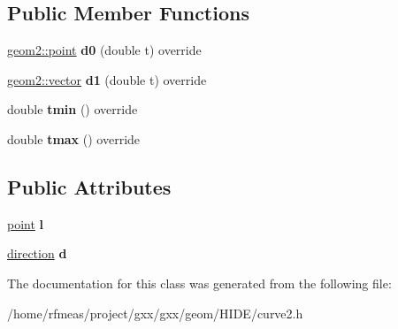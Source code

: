 \subsection*{Public Member Functions}
\begin{DoxyCompactItemize}
\item 
\hyperlink{classmalgo_1_1vector2}{geom2\+::point} {\bfseries d0} (double t) override\hypertarget{classgxx_1_1curve2_1_1line_ad0eb33818eed7291d30b1c2c5fff5899}{}\label{classgxx_1_1curve2_1_1line_ad0eb33818eed7291d30b1c2c5fff5899}

\item 
\hyperlink{classmalgo_1_1vector2}{geom2\+::vector} {\bfseries d1} (double t) override\hypertarget{classgxx_1_1curve2_1_1line_a510227cdeed575ea100866926f447ae7}{}\label{classgxx_1_1curve2_1_1line_a510227cdeed575ea100866926f447ae7}

\item 
double {\bfseries tmin} () override\hypertarget{classgxx_1_1curve2_1_1line_ab8c6acdc4d1d0dcc17613cb3e727a881}{}\label{classgxx_1_1curve2_1_1line_ab8c6acdc4d1d0dcc17613cb3e727a881}

\item 
double {\bfseries tmax} () override\hypertarget{classgxx_1_1curve2_1_1line_a54a7c880465ddca9da79d442a0e51584}{}\label{classgxx_1_1curve2_1_1line_a54a7c880465ddca9da79d442a0e51584}

\end{DoxyCompactItemize}
\subsection*{Public Attributes}
\begin{DoxyCompactItemize}
\item 
\hyperlink{classmalgo_1_1vector2}{point} {\bfseries l}\hypertarget{classgxx_1_1curve2_1_1line_a08e5c930365be19f7a8d3c3a1b7a15a8}{}\label{classgxx_1_1curve2_1_1line_a08e5c930365be19f7a8d3c3a1b7a15a8}

\item 
\hyperlink{classmalgo_1_1unit__vector2}{direction} {\bfseries d}\hypertarget{classgxx_1_1curve2_1_1line_ae7ef114ac99584657fb7fc59bd543b36}{}\label{classgxx_1_1curve2_1_1line_ae7ef114ac99584657fb7fc59bd543b36}

\end{DoxyCompactItemize}


The documentation for this class was generated from the following file\+:\begin{DoxyCompactItemize}
\item 
/home/rfmeas/project/gxx/gxx/geom/\+H\+I\+D\+E/curve2.\+h\end{DoxyCompactItemize}
